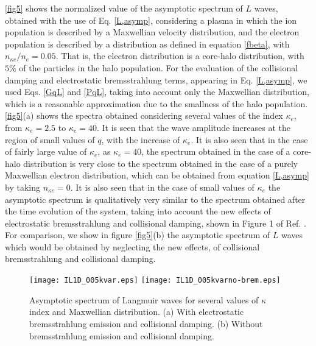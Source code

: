 \documentclass[12pt,a4paper,ruledheader]{report}
\begin{document}
\begin{appendix}
\autoref{fig5} shows the normalized value of the asymptotic spectrum of
$L$ waves, obtained with the use of Eq. \eqref{L,asymp}, considering a
plasma in which the ion population is described by a Maxwellian velocity
distribution, and the electron population is described by a distribution
as defined in equation \eqref{fbeta}, with $n_{\kappa e}/n_e= 0.05$. That
is, the electron distribution is a core-halo distribution, with $5\%$
of the particles in the halo population. For the evaluation of the
collisional damping and electrostatic bremsstrahlung terms, appearing
in Eq. \eqref{L,asymp}, we used Eqs. \eqref{GqL} and \eqref{PqL}, taking
into account only the Maxwellian distribution, which is a reasonable
approximation  due to the smallness of the halo population. 
\autoref{fig5}(a) shows the spectra obtained considering several values
of the index $\kappa_e$, from $\kappa_e=2.5$ to $\kappa_e=40$. It is seen
that the wave amplitude increases at the region of small values of $q$,
with the increase of $\kappa_e$. It is also seen that in the case of
fairly large value of $\kappa_e$, as $\kappa_e=40$, the spectrum obtained
in the case of a core-halo distribution is very close to the spectrum
obtained in the case of a purely Maxwellian electron distribution, which
can be obtained from equation \eqref{L,asymp} by taking $n_{\kappa e}=0$.
It is also seen that in the case of small values of $\kappa_e$ the
asymptotic spectrum is qualitatively very similar to the spectrum
obtained after the time evolution of the system, taking into account
the new effects of electrostatic bremsstrahlung and collisional damping,
shown in Figure 1 of Ref. \cite{Tigik2017a}. For comparison, we
show in figure \autoref{fig5}(b) the asymptotic spectrum of $L$ waves
which would be obtained by neglecting the new effects, of collisional
bremsstrahlung and collisional damping.
\begin{figure}[h]
  \begin{center}
    \texttt{[image: IL1D\_005kvar.eps]}
    \texttt{[image: IL1D\_005kvarno-brem.eps]}
    \caption{Asymptotic spectrum of Langmuir waves for several values
      of $\kappa$ index and Maxwellian distribution. (a) With electrostatic
    bremsstrahlung emission and collisional damping.
   (b) Without bremsstrahlung emission and collisional damping.}
    \label{fig5}
  \end{center}
\end{figure}


\end{appendix}
\end{document}
